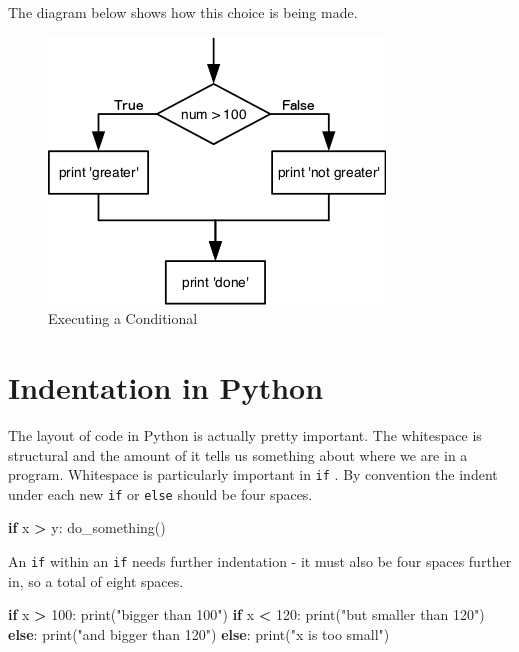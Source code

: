 \documentclass[]{book}
\newenvironment{Shaded}{\begin{snugshade}}{\end{snugshade}}
\newcommand{\BuiltInTok}[1]{#1}
\newcommand{\ControlFlowTok}[1]{\textcolor[rgb]{0.13,0.29,0.53}{\textbf{#1}}}
\newcommand{\DecValTok}[1]{\textcolor[rgb]{0.00,0.00,0.81}{#1}}
\newcommand{\NormalTok}[1]{#1}
\newcommand{\OperatorTok}[1]{\textcolor[rgb]{0.81,0.36,0.00}{\textbf{#1}}}
\newcommand{\StringTok}[1]{\textcolor[rgb]{0.31,0.60,0.02}{#1}}
\theoremstyle{definition}
\theoremstyle{definition}
\theoremstyle{definition}
\theoremstyle{remark}
\begin{document}
The diagram below shows how this choice is being made.

\begin{figure}
\centering
\includegraphics{assets/python-flowchart-conditional.png}
\caption{Executing a Conditional}
\end{figure}

\hypertarget{indentation-in-python}{%
\section{Indentation in Python}\label{indentation-in-python}}

The layout of code in Python is actually pretty important. The
whitespace is structural and the amount of it tells us something about
where we are in a program. Whitespace is particularly important in
\texttt{if} . By convention the indent under each new \texttt{if} or
\texttt{else} should be four spaces.

\begin{Shaded}
\begin{Highlighting}[]
\ControlFlowTok{if}\NormalTok{ x }\OperatorTok{>}\NormalTok{ y:}
\NormalTok{    do_something()}
\end{Highlighting}
\end{Shaded}

An \texttt{if} within an \texttt{if} needs further indentation - it must
also be four spaces further in, so a total of eight spaces.

\begin{Shaded}
\begin{Highlighting}[]
\ControlFlowTok{if}\NormalTok{ x }\OperatorTok{>} \DecValTok{100}\NormalTok{:}
    \BuiltInTok{print}\NormalTok{(}\StringTok{"bigger than 100"}\NormalTok{)}
    \ControlFlowTok{if}\NormalTok{ x  }\OperatorTok{<} \DecValTok{120}\NormalTok{:}
        \BuiltInTok{print}\NormalTok{(}\StringTok{"but smaller than 120"}\NormalTok{)}
    \ControlFlowTok{else}\NormalTok{:}
        \BuiltInTok{print}\NormalTok{(}\StringTok{"and bigger than 120"}\NormalTok{)}
\ControlFlowTok{else}\NormalTok{:}
    \BuiltInTok{print}\NormalTok{(}\StringTok{"x is too small"}\NormalTok{)}
\end{Highlighting}
\end{Shaded}
\end{document}
